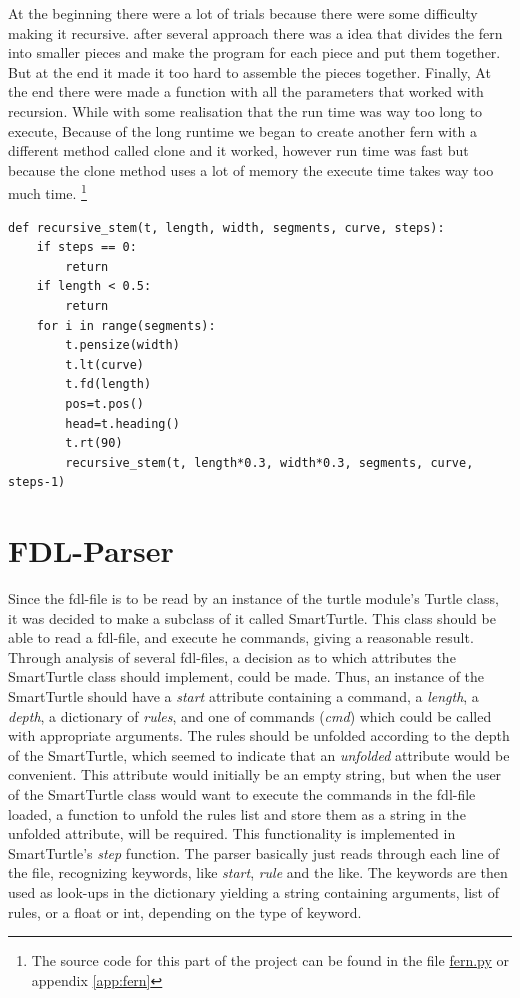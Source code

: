 \documentclass[titlepage]{article}
\begin{document}
\par
At the beginning there were a lot of trials because there were some difficulty making it recursive. after several approach there was a idea that divides the fern into smaller pieces and make the program for each piece and put them together. But at the end it made it too hard to assemble the pieces together. Finally, At the end there were made a function with all the parameters that worked with recursion. While with some realisation that the run time was way too long to execute, Because of the long runtime we began to create another fern with a different method called clone and it worked, however run time was fast but because the clone method uses a lot of memory the execute time takes way too much time. \footnote{The source code for this part of the project can be found in the file \href{https://github.com/ErikAndersen81/DM550-FractalProject/blob/master/fern.py}{fern.py} or appendix \ref{app:fern}}


\begin{verbatim}  
def recursive_stem(t, length, width, segments, curve, steps):
    if steps == 0:
        return
    if length < 0.5:
        return
    for i in range(segments):
        t.pensize(width)
        t.lt(curve)
        t.fd(length)
        pos=t.pos()
        head=t.heading()
        t.rt(90)
        recursive_stem(t, length*0.3, width*0.3, segments, curve, steps-1)
\end{verbatim}

\section{FDL-Parser}
Since the fdl-file is to be read by an instance of the turtle module's Turtle class, it was decided to make a subclass of it called SmartTurtle. This class should be able to read a fdl-file, and execute he commands, giving a reasonable result. Through analysis of several fdl-files, a decision as to which attributes the SmartTurtle class should implement, could be made. Thus, an instance of the SmartTurtle should have a \textit{start} attribute containing a command, a \textit{length}, a \textit{depth}, a dictionary of \textit{rules}, and one of commands (\textit{cmd}) which could be called with appropriate arguments. The rules should be unfolded according to the depth of the SmartTurtle, which seemed to indicate that an \textit{unfolded} attribute would be convenient. This attribute would initially be an empty string, but when the user of the SmartTurtle class would want to execute the commands in the fdl-file loaded, a function to unfold the rules list and store them as a string in the unfolded attribute, will be required. This functionality is implemented in SmartTurtle's \textit{step} function. The parser basically just reads through each line of the file, recognizing keywords, like \textit{start}, \textit{rule} and the like. The keywords are then used as look-ups in the dictionary yielding a string containing arguments, list of rules, or a float or int, depending on the type of keyword. 
\end{document}
